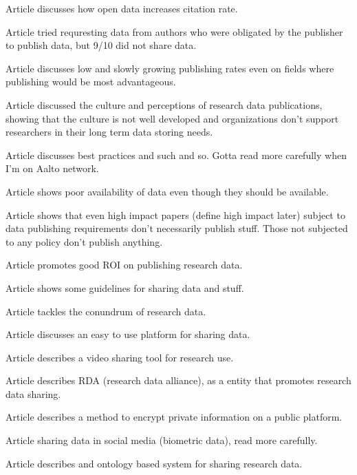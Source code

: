 Article \cite{piwowar2007sharing} discusses how open data increases citation
rate.

Article \cite{savage2009empirical} tried requresting data from authors who were
obligated by the publisher to publish data, but 9/10 did not share data.

Article \cite{piwowar2011shares} discusses low and slowly growing publishing
rates even on fields where publishing would be most advantageous.

Article \cite{tenopir2011data} discussed the culture and perceptions of
research data publications, showing that the culture is not well developed
and organizations don't support  researchers in their long term data storing
needs.

Article \cite{whitlock2011data} discusses best practices and such and so.
Gotta read more carefully when I'm on Aalto network.

Article \cite{wicherts2006poor} shows poor availability of data even though
they should be available.

Article \cite{alsheikh2011public} shows that even high impact papers (define
high impact later) subject to data publishing requirements don't necessarily
publish stuff. Those not subjected to any policy don't publish anything.

Article \cite{piwowar2011data} promotes good ROI on publishing research data.

Article \cite{hrynaszkiewicz2010preparing} shows some guidelines for sharing
data and stuff.

Article \cite{DBLP:journals/jasis/Borgman12} tackles the conundrum of research
data.

Article \cite{DBLP:conf/isiwi/AlamMS15} discusses an easy to use platform for
sharing data.

Article \cite{DBLP:conf/jcdl/SimonGSG15} describes a video sharing tool for research
use.

Article \cite{DBLP:journals/dlib/BermanWW14} describes RDA (research data
alliance), as a entity that promotes research data sharing.

Article \cite{DBLP:journals/jam/NohCJ14a} describes a method to encrypt private
information on a public platform.

Article \cite{DBLP:conf/ACMdis/CurmiFW14a} sharing data in social media
(biometric data), read more carefully.

Article \cite{DBLP:conf/esws/EkaputraSSB14} describes and ontology based
system for sharing research data.

